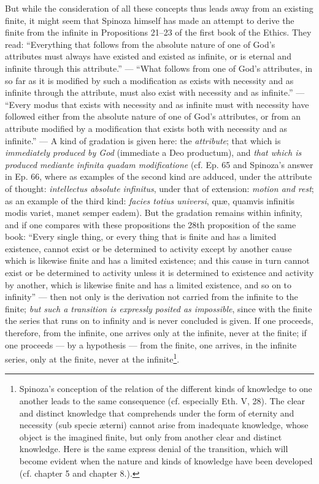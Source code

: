 \documentclass[12pt,a4paper,openany]{book}
\newcommand{\opage}[1]{\marginnote{\footnotesize\textit{[#1]}}}
\begin{document}
But while the consideration of all these concepts thus leads away
from an existing finite, it might seem that Spinoza himself has
made an attempt to derive the finite from the infinite in
Propositions 21--23 of the first book of the Ethics. They read: ``Everything that
follows from the absolute nature of one of God's attributes must always have
existed and existed as infinite, or is eternal and infinite through
this attribute.'' --- ``What follows from one of God's attributes,
in so far as it is modified by such a modification as
exists with necessity and as infinite through the attribute, must also
exist with necessity and as infinite.'' --- ``Every modus that
exists with necessity and as infinite must with necessity have
followed either from the absolute nature of one of God's attributes, or from
an attribute modified by a modification that exists both with
necessity and as infinite.'' --- A kind of gradation is given here:
the \emph{attribute}; that which is \emph{immediately produced by God} (immediate
a Deo productum), and \emph{that which is produced mediante infinita
quadam modificatione} (cf. Ep. 65 and Spinoza's answer in
\opage{59} Ep. 66, where as examples of the second kind are adduced, under
the attribute of thought: \emph{intellectus absolute infinitus}, under
that of extension: \emph{motion and rest}; as an example of the third
kind: \emph{facies totius universi}, quæ, quamvis infinitis modis
variet, manet semper eadem). But the gradation remains within
infinity, and if one compares with these propositions the 28th
proposition of the same book: ``Every single thing, or every thing that is
finite and has a limited existence, cannot exist or
be determined to activity except by another cause which is likewise
finite and has a limited existence; and this cause in turn cannot
exist or be determined to activity unless it is determined
to existence and activity by another, which is likewise finite and
has a limited existence, and so on to infinity'' --- then
not only is the derivation not carried from the infinite to the
finite; \emph{but such a transition is expressly posited as
impossible}, since with the finite the series that runs on to infinity and is never
concluded is given. If one proceeds, therefore, from the infinite,
one arrives only at the infinite, never at the finite; if one proceeds ---
by a hypothesis --- from the finite, one arrives, in the infinite
series, only at the finite, never at the
infinite\footnote{Spinoza's conception of the relation of the different kinds of
knowledge to one another leads to the same consequence (cf. especially
Eth. V, 28). The clear and distinct
knowledge that comprehends under the form of eternity and necessity
(sub specie æterni) cannot arise from inadequate knowledge,
whose object is the imagined finite, but only from another clear
and distinct knowledge. Here is the same express denial of the
transition, which will become evident when the nature and
kinds of knowledge have been developed (cf. chapter 5 and chapter 8.).}.
\end{document}

